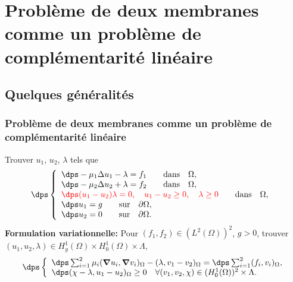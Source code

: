 \documentclass{beamer}
\begin{document}
\section{Problème de deux membranes comme un problème de complémentarité linéaire}  
  \subsection{Quelques généralités} 
\begin{frame}

\frametitle{Problème de deux membranes comme un problème de complémentarité linéaire}
Trouver $u_1$, $u_2$, $\lambda$ tels que
\begin{equation}
\dps
\left\lbrace\begin{array}{llccc}
\dps -\mu_1 \Delta u_1-\lambda = f_1 \qquad \mbox{dans} \quad \Omega, \\
\dps -\mu_2 \Delta u_2+\lambda = f_2 \qquad \mbox{dans} \quad \Omega,\\
\textcolor{red}{\dps (u_1-u_2)\lambda=0, \quad u_1-u_2 \geq 0, \quad 
\lambda \geq 0} \qquad \mbox{dans} \quad \Omega, \hspace{0.2 cm}\\
\dps u_1=g \qquad \mbox{sur} \quad\partial \Omega,\\
\dps u_2=0 \qquad \mbox{sur} \quad\partial \Omega.
\end{array}
\right.
\label{eq:modele_initial_membrane}
\end{equation}
\textbf{Formulation variationnelle:}
Pour $(f_1,f_2)\in (L^2(\Omega))^2$, $g>0$, 
trouver $(u_1,u_2,\lambda)\in H_g^1(\Omega)\times H_0^1(\Omega) \times \Lambda$,
\begin{equation}
\dps
\left\lbrace\begin{array}{llccc}
\dps \sum_{i=1}^2 \mu_i ({\bm \nabla} u_i,{\bm \nabla} v_i)_{\Omega}-(\lambda,v_1-v_2)_{\Omega}=\dps \sum_{i=1}^2( f_i,v_i)_{\Omega}, \\
\dps (\chi- \lambda,u_1-u_2)_{\Omega}\geq 0 \quad \forall (v_1,v_2,\chi)\in (H_0^1(\Omega))^2 \times \Lambda.
\end{array}
\right.
\label{eq:formulation_variationnelle_probleme_initial}
\end{equation}
\end{frame}
\end{document}
